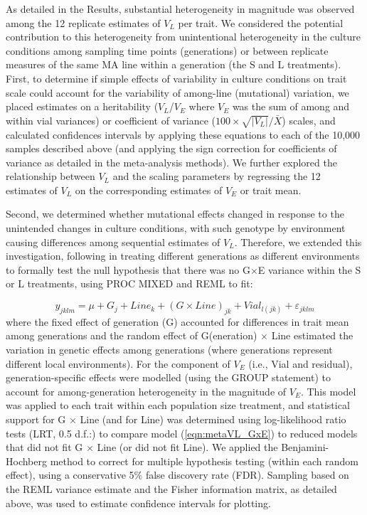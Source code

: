 As detailed in the Results, substantial heterogeneity in magnitude was observed among the 12 replicate estimates of $V_L$ per trait. We considered the potential contribution to this heterogeneity from unintentional heterogeneity in the culture conditions among sampling time points (generations) or between replicate measures of the same MA line within a generation (the S and L treatments). First, to determine if simple effects of variability in culture conditions on trait scale could account for the variability of among-line (mutational) variation, we placed estimates on a heritability ($V_L$/$V_E$ where $V_E$ was the sum of among and within vial variances) or coefficient of variance ($100\times\sqrt{\left|V_L\right|}/\bar{X}$) scales, and calculated confidences intervals by applying these equations to each of the 10,000 samples described above (and applying the sign correction for coefficients of variance as detailed in the meta-analysis methods). We further explored the relationship between $V_L$ and the scaling parameters by regressing the 12 estimates of $V_L$ on the corresponding estimates of $V_E$ or trait mean.\par

Second, we determined whether mutational effects changed in response to the unintended changes in culture conditions, with such genotype by environment causing differences among sequential estimates of $V_L$. Therefore, we extended this investigation, following \citet{Garc00} in treating different generations as different environments to formally test the null hypothesis that there was no G$\times$E variance within the S or L treatments, using PROC MIXED and REML to fit: \par
\begin{equation}
\label{eqn:metaVL_GxE}
y_{jklm}=\mu + G_j+ Line_k + (G \times Line)_{jk} + Vial_{l(jk)} + \varepsilon_{jklm}
\end{equation}
\noindent where the fixed effect of generation (G) accounted for differences in trait mean among generations and the random effect of G(eneration) $\times$ Line estimated the variation in genetic effects among generations (where generations represent different local environments). For the component of $V_E$ (i.e., Vial and residual), generation-specific effects were modelled (using the GROUP statement) to account for among-generation heterogeneity in the magnitude of $V_E$. This model was applied to each trait within each population size treatment, and statistical support for G $\times$ Line (and for Line) was determined using log-likelihood ratio tests (LRT, 0.5 d.f.:\citealp{Self87,Litt06}) to compare model (\ref{eqn:metaVL_GxE}) to reduced models that did not fit G $\times$ Line (or did not fit Line). We applied the Benjamini-Hochberg method \citep{Benj95} to correct for multiple hypothesis testing (within each random effect), using a conservative 5\% false discovery rate (FDR). Sampling based on the REML variance estimate and the Fisher information matrix, as detailed above, was used to estimate confidence intervals for plotting.\par

